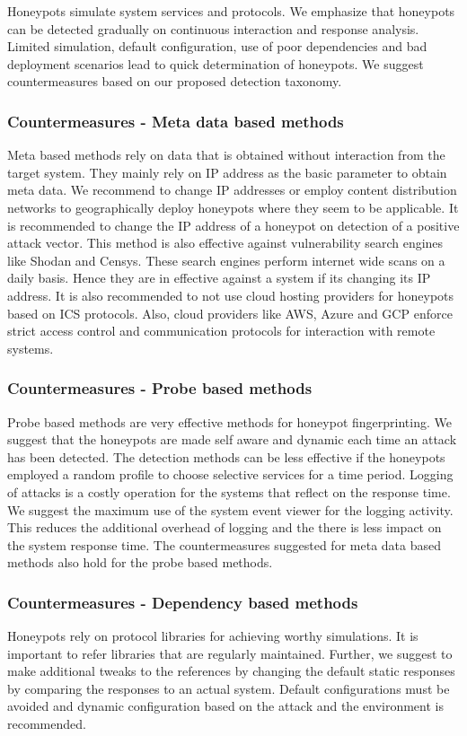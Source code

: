 \documentclass[../main.tex]{subfiles}
\begin{document}
Honeypots simulate system services and protocols. We emphasize that honeypots can be detected gradually on continuous interaction and response analysis. Limited simulation, default configuration, use of poor dependencies and bad deployment scenarios lead to quick determination of honeypots. We suggest countermeasures based on our proposed detection taxonomy. 

\subsubsection{Countermeasures - Meta data based methods}
Meta based methods rely on data that is obtained without interaction from the target system. They mainly rely on IP address as the basic parameter to obtain meta data. We recommend to change IP addresses or employ content distribution networks to geographically deploy honeypots where they seem to be applicable.  It is recommended to change the IP address of a honeypot on detection of a positive attack vector. This method is also effective against vulnerability search engines like Shodan and Censys. These search engines perform internet wide scans on a daily basis. Hence they are in effective against a system if its changing its IP address. It is also recommended to not use cloud hosting providers for honeypots based on ICS protocols. Also, cloud providers like AWS, Azure and GCP enforce strict access control and communication protocols for interaction with remote systems. 


\subsubsection{Countermeasures - Probe based methods}
Probe based methods are very effective methods for honeypot fingerprinting. We suggest that the honeypots are made self aware and dynamic each time an attack has been detected. The detection methods can be less effective if the honeypots employed a random profile to choose selective services for a time period.  Logging of attacks is a costly operation for the systems that reflect on the response time. We suggest the maximum use of the system event viewer for the logging activity. This reduces the additional overhead of logging and the there is less impact on the system response time. The countermeasures suggested for meta data based methods also hold for the probe based methods. 

\subsubsection{Countermeasures - Dependency based methods}
Honeypots rely on protocol libraries for achieving worthy simulations. It is important to refer libraries that are regularly maintained. Further, we suggest to make additional tweaks to the references by changing the default static responses by comparing the responses to an actual system. Default configurations must be avoided and dynamic configuration based on the attack and the environment is recommended. 
\end{document}
